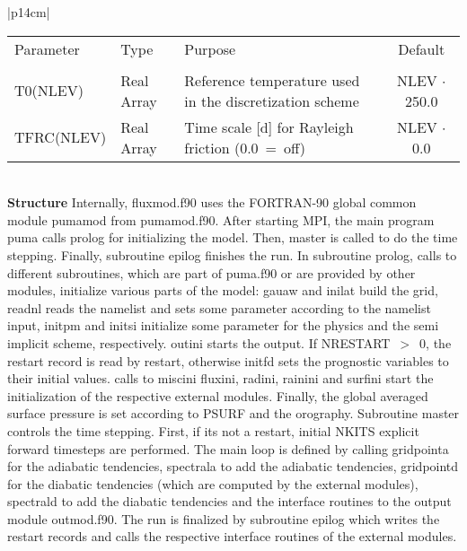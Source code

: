 \newpage 

\begin{center}
\begin{tabular}{|p{14cm}|}
\begin{center}
\begin{tabular}{l l p{5cm} c} %
Parameter & Type & Purpose & Default \\
&&&\\
T0(NLEV) & Real Array& Reference temperature used in the discretization scheme & NLEV
$\cdot$ 250.0 \\
TFRC(NLEV) & Real Array & Time scale [d] for Rayleigh friction (0.0~=~off)& NLEV
$\cdot$ 0.0
\end{tabular} 
\end{center}
\vspace{3mm} \\
\hline
\vspace{2mm} {\bf Structure} Internally, {\module fluxmod.f90} uses the FORTRAN-90
global common module {\modu pumamod} from
{\module pumamod.f90}. After starting MPI, the main program {\sub puma} calls {\sub
prolog} for initializing the model. Then, {\sub master} is called to do the time stepping.
Finally, subroutine {\sub epilog} finishes the run. In subroutine {\sub prolog}, calls to
different subroutines, which are part of {\module puma.f90} or are  provided by other
modules, initialize various parts of the model: {\sub gauaw} and {\sub inilat} build  the grid,
{\sub readnl} reads the namelist and sets some parameter according to the namelist input,
{\sub initpm} and {\sub initsi} initialize  some parameter for the physics and the semi
implicit
scheme, respectively. {\sub outini} starts the output. If NRESTART~$>$~0, the restart
record
is read by {\sub restart}, otherwise {\sub initfd} sets the prognostic variables to their initial
values.  calls to {\sub miscini} {\sub fluxini}, {\sub radini}, {\sub rainini} and {\sub surfini}
start the initialization of the respective external modules. Finally, the global averaged surface
pressure is set according to PSURF and the orography. Subroutine {\sub master} controls the
time stepping. First, if its not a restart, initial NKITS explicit forward timesteps are
performed.
The main loop is defined by calling {\sub gridpointa} for the adiabatic tendencies, {\sub
spectrala} to add the adiabatic tendencies, {\sub gridpointd} for the diabatic tendencies
(which
are computed  by the external modules), {\sub spectrald} to add the diabatic tendencies and
the
interface routines to the output module {\module outmod.f90}. The run is finalized by
subroutine
{\sub epilog} which writes the restart records and calls the respective interface routines of the
external modules. \vspace{3mm} \\
\hline
\end{tabular}
\end{center}
